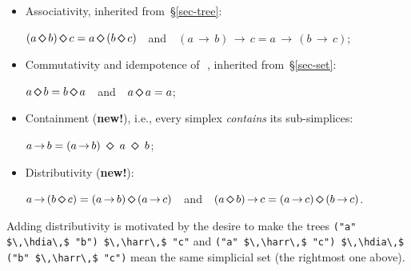 \documentclass[english,submission]{programming}
\newcommand{\code}[1]{\lstinline[mathescape]|#1|}
\newcommand{\hdia}{\,\text{\raisebox{-0.2mm}{\Large\color{darkblue} $\diamond$}}\,}
\newcommand{\harr}{\,\text{\color{darkblue} $\rightarrow$}\,}
\newcommand{\dia}{\,\text{\raisebox{-0.3mm}{\Large $\diamond$}}\,}
\newcommand{\arr}{\,\text{$\rightarrow$}\,}
\begin{document}
\vspace{-1mm}\begin{itemize}
    \item Associativity, inherited from~\S\ref{sec-tree}:

          \vspace{0.5mm}\hspace{10mm}$(a \dia b) \dia c = a \dia (b \dia c)$~~and~~$(a \arr b) \arr c = a \arr (b \arr c)$;

    \item Commutativity and idempotence of \dia, inherited from~\S\ref{sec-set}:

          \vspace{0.5mm}\hspace{10mm}$a \dia b = b \dia a$~~and~~$a \dia a = a$;

    \item Containment (\textbf{\color{darkblue}new!}), i.e., every simplex
          \emph{contains} its sub-simplices:

          \vspace{0.5mm}\hspace{10mm}$a \arr b = (a \arr b)\ \dia\ a\ \dia\ b$;

    \item Distributivity (\textbf{\color{darkblue}new!}):

          \vspace{0.5mm}\hspace{10mm}$a \arr (b \dia c) = (a \arr b) \dia (a \arr c)$~~and~~$(a \dia b) \arr c = (a \arr c) \dia (b \arr c)$.
\end{itemize}

\noindent
Adding distributivity is motivated by the desire to make the trees
\code{("a" $\,\hdia\,$ "b") $\,\harr\,$ "c"} and
\code{("a" $\,\harr\,$ "c") $\,\hdia\,$ ("b" $\,\harr\,$ "c")} mean the same
simplicial set (the rightmost one above).
\end{document}
